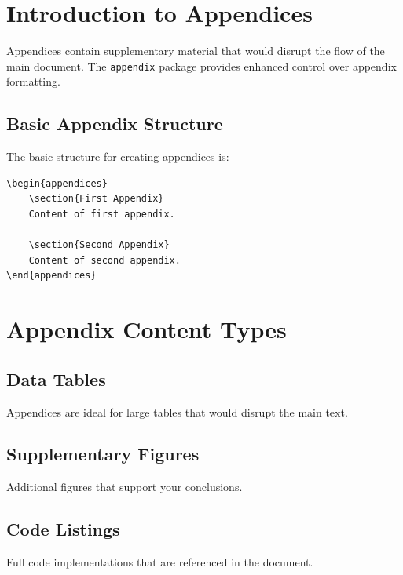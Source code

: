 \clearpage
\appendixpage
\begin{appendices}

\section{Introduction to Appendices}\label{sec:intro}
Appendices contain supplementary material that would disrupt the flow of the main document.
The \texttt{appendix} package provides enhanced control over appendix formatting.

\subsection{Basic Appendix Structure}\label{subsec:basic-appendix}
The basic structure for creating appendices is:

\begin{verbatim}
\begin{appendices}
    \section{First Appendix}
    Content of first appendix.

    \section{Second Appendix}
    Content of second appendix.
\end{appendices}
\end{verbatim}

\section{Appendix Content Types}\label{sec:content}

\subsection{Data Tables}\label{subsec:appendix-tables}
Appendices are ideal for large tables that would disrupt the main text.

\subsection{Supplementary Figures}\label{subsec:appendix-figures}
Additional figures that support your conclusions.

\subsection{Code Listings}\label{subsec:appendix-code}
Full code implementations that are referenced in the document.


\end{appendices}
